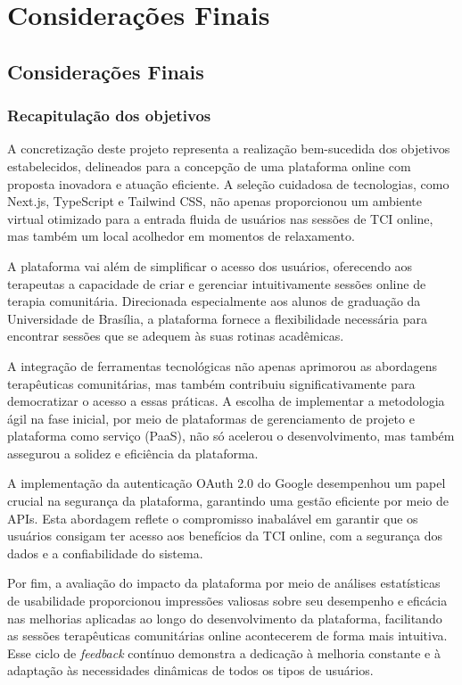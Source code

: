 \part{Considerações Finais}
\chapter{Considerações Finais}
\section{Recapitulação dos objetivos}
    A concretização deste projeto representa a realização bem-sucedida dos objetivos estabelecidos, delineados para a concepção de uma plataforma online com proposta inovadora e atuação eficiente. A seleção cuidadosa de tecnologias, como Next.js, TypeScript e Tailwind CSS, não apenas proporcionou um ambiente virtual otimizado para a entrada fluida de usuários nas sessões de TCI online, mas também um local acolhedor em momentos de relaxamento.
    
    A plataforma vai além de simplificar o acesso dos usuários, oferecendo aos terapeutas a capacidade de criar e gerenciar intuitivamente sessões online de terapia comunitária. Direcionada especialmente aos alunos de graduação da Universidade de Brasília, a plataforma fornece a flexibilidade necessária para encontrar sessões que se adequem às suas rotinas acadêmicas.
    
    A integração de ferramentas tecnológicas não apenas aprimorou as abordagens terapêuticas comunitárias, mas também contribuiu significativamente para democratizar o acesso a essas práticas. A escolha de implementar a metodologia ágil na fase inicial, por meio de plataformas de gerenciamento de projeto e plataforma como serviço (PaaS), não só acelerou o desenvolvimento, mas também assegurou a solidez e eficiência da plataforma.
    
    A implementação da autenticação OAuth 2.0 do Google desempenhou um papel crucial na segurança da plataforma, garantindo uma gestão eficiente por meio de APIs. Esta abordagem reflete o compromisso inabalável em garantir que os usuários consigam ter acesso aos benefícios da TCI online, com a segurança dos dados e a confiabilidade do sistema.
    
    Por fim, a avaliação do impacto da plataforma por meio de análises estatísticas de usabilidade proporcionou impressões valiosas sobre seu desempenho e eficácia nas melhorias aplicadas ao longo do desenvolvimento da plataforma, facilitando as sessões terapêuticas comunitárias online acontecerem de forma mais intuitiva. Esse ciclo de \textit{feedback} contínuo demonstra a dedicação à melhoria constante e à adaptação às necessidades dinâmicas de todos os tipos de usuários.
    
